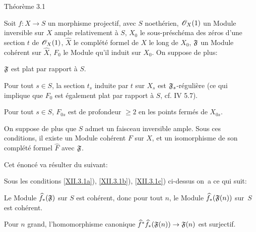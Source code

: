 \setcounter{equation}{16}%
\label{XII.3.1}%
\begin{enonce*}{Th\'eor\`eme 3.1\ndemark}

Soit $f:X\to S$ un morphisme projectif, avec $S$ noeth\'erien, $\mathscr{O}_X(1)$ un Module inversible sur $X$ ample relativement \`a $S$, $X_0$ le sous-pr\'esch\'ema des z\'eros d'une section $t$ de $\mathscr{O}_X(1)$, $\widehat{X}$ le compl\'et\'e formel de $X$ le long de $X_0$, $\mathfrak{F}$ un Module coh\'erent sur $\widehat{X}$, $F_0$ le Module qu'il induit sur $X_0$. On suppose de plus:
\begin{enumeratea}
\item\label{XII.3.1a}
$\mathfrak{F}$ est plat par rapport \`a $S$.
\item\label{XII.3.1b}
Pour tout $s\in S$, la section $t_s$ induite par $t$ sur $X_s$ est $\mathfrak{F}_s$-r\'eguli\`ere (ce qui implique que $F_0$ est \'egalement plat par rapport \`a $S$, cf. \textup{ IV 5.7}).
\item\label{XII.3.1c}
Pour tout $s\in S$, $F_{0s}$ est de profondeur $\geq 2$ en les points ferm\'es de $X_{0s}$.
\end{enumeratea}
On suppose de plus que $S$ admet un faisceau inversible ample. Sous ces conditions, il existe un Module coh\'erent $F$ sur $X$, et un isomorphisme de son compl\'et\'e formel $\widehat{F}$ avec $\mathfrak{F}$.
\end{enonce*}

Cet \'enonc\'e va r\'esulter du suivant:

\begin{corollaire} \label{XII.3.2}
Sous les conditions \ref{XII.3.1a}), \ref{XII.3.1b}), \ref{XII.3.1c}) ci-dessus on~a ce qui suit:
\begin{enumeratei}
\item
Le Module $\widehat{f}_\ast(\mathfrak{F})$ sur $S$ est coh\'erent, donc pour tout $n$, le Module $\widehat{f}_\ast(\mathfrak{F}(n))$ sur~$S$ est coh\'erent.
\item
Pour $n$ grand, l'homomorphisme canonique $\widehat{f}^\ast\widehat{f}_\ast(\formelF(n))\to \formelF(n)$ est surjectif.
\end{enumeratei}
\end{corollaire}

